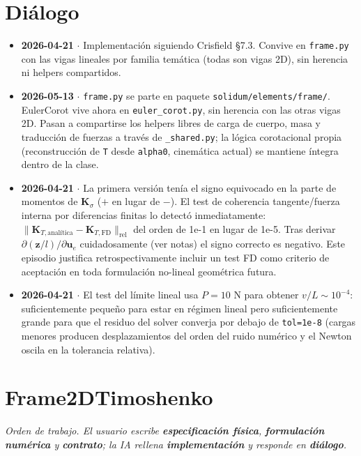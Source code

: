 \documentclass[11pt,letterpaper,oneside]{report}
\begin{document}
\section{Diálogo}

\begin{itemize}
  \item \textbf{2026-04-21} \ensuremath{\cdot} Implementación siguiendo Crisfield §7.3. Convive en \texttt{frame.py} con las vigas lineales por familia temática (todas son vigas 2D), sin herencia ni helpers compartidos.
  \item \textbf{2026-05-13} \ensuremath{\cdot} \texttt{frame.py} se parte en paquete \texttt{solidum/elements/frame/}. EulerCorot vive ahora en \texttt{euler\_corot.py}, sin herencia con las otras vigas 2D. Pasan a compartirse los helpers libres de carga de cuerpo, masa y traducción de fuerzas a través de \texttt{\_shared.py}; la lógica corotacional propia (reconstrucción de \texttt{T} desde \texttt{alpha0}, cinemática actual) se mantiene íntegra dentro de la clase.
  \item \textbf{2026-04-21} \ensuremath{\cdot} La primera versión tenía el signo equivocado en la parte de momentos de $\mathbf K_\sigma$ ($+$ en lugar de $-$). El test de coherencia tangente/fuerza interna por diferencias finitas lo detectó inmediatamente: $\|\mathbf K_{T,\text{analítica}} - \mathbf K_{T,\text{FD}}\|_{\text{rel}}$ del orden de 1e-1 en lugar de 1e-5. Tras derivar $\partial(\mathbf z/l)/\partial\mathbf u_e$ cuidadosamente (ver notas) el signo correcto es negativo. Este episodio justifica retrospectivamente incluir un test FD como criterio de aceptación en toda formulación no-lineal geométrica futura.
  \item \textbf{2026-04-21} \ensuremath{\cdot} El test del límite lineal usa $P=10$ N para obtener $v/L \sim 10^{-4}$: suficientemente pequeño para estar en régimen lineal pero suficientemente grande para que el residuo del solver converja por debajo de \texttt{tol=1e-8} (cargas menores producen desplazamientos del orden del ruido numérico y el Newton oscila en la tolerancia relativa).
\end{itemize}


\newpage

\section{Frame2DTimoshenko}



\textit{Orden de trabajo. El usuario escribe \textbf{especificación física}, \textbf{formulación numérica} y \textbf{contrato}; la IA rellena \textbf{implementación} y responde en \textbf{diálogo}.}
\end{document}
